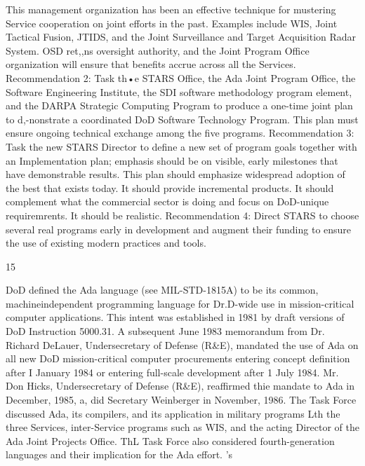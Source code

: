 \documentclass[12pt]{article}
\begin{document}
This management organization has been an effective technique for mustering Service
cooperation on joint efforts in the past. Examples include WIS, Joint Tactical Fusion,
JTIDS, and the Joint Surveillance and Target Acquisition Radar System. OSD ret,,ns
oversight authority, and the Joint Program Office organization will ensure that benefits
accrue across all the Services.
Recommendation 2: Task th•e STARS Office, the Ada Joint Program Office,
the Software Engineering Institute, the SDI software methodology program
element, and the DARPA Strategic Computing Program to produce a one-time
joint plan to d,-nonstrate a coordinated DoD Software Technology Program.
This plan must ensure ongoing technical exchange among the five programs.
Recommendation 3: Task the new STARS Director to define a new set of
program goals together with an Implementation plan; emphasis should be on
visible, early milestones that have demonstrable results.
This plan should emphasize widespread adoption of the best that exists today. It
should provide incremental products. It should complement what the commercial sector
is doing and focus on DoD-unique requiremrents. It should be realistic.
Recommendation 4: Direct STARS to choose several real programs early in
development and augment their funding to ensure the use of existing modern
practices and tools.

15

DoD defined the Ada language (see MIL-STD-1815A) to be its common, machineindependent programming language for Dr.D-wide use in mission-critical computer applications. This intent was established in 1981 by draft versions of DoD Instruction 5000.31. A
subsequent June 1983 memorandum from Dr. Richard DeLauer, Undersecretary of Defense
(R\&E), mandated the use of Ada on all new DoD mission-critical computer procurements
entering concept definition after I January 1984 or entering full-scale development after 1
July 1984. Mr. Don Hicks, Undersecretary of Defense (R\&E), reaffirmed thie mandate to
Ada in December, 1985, a, did Secretary Weinberger in November, 1986.
The Task Force discussed Ada, its compilers, and its application in military programs
Lth the three Services, inter-Service programs such as WIS, and the acting Director of
the Ada Joint Projects Office. ThL Task Force also considered fourth-generation languages
and their implication for the Ada effort.
's
\end{document}
